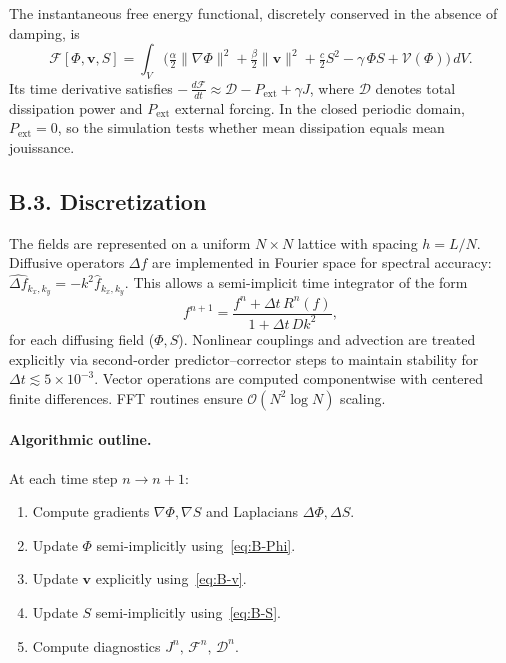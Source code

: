 \documentclass[12pt,a4paper]{article}
\begin{document}
The instantaneous free energy functional, discretely conserved in the absence of damping, is
\begin{equation}
\label{eq:B-F}
\mathcal{F}[\Phi,\mathbf{v},S]
 = \int_V
 \Big(
 \tfrac{\alpha}{2}\|\nabla\Phi\|^2
 + \tfrac{\beta}{2}\|\mathbf{v}\|^2
 + \tfrac{c}{2}S^2
 - \gamma\,\Phi S
 + \mathcal{V}(\Phi)
 \Big)\,dV.
\end{equation}
Its time derivative satisfies
\(-\,\tfrac{d\mathcal{F}}{dt}\!\approx\!\mathcal{D}-P_{\text{ext}}+\gamma J\),
where \(\mathcal{D}\) denotes total dissipation power and \(P_{\text{ext}}\) external forcing.
In the closed periodic domain, \(P_{\text{ext}}\!=\!0\), so the simulation tests whether mean dissipation equals mean jouissance.

\subsection*{B.3. Discretization}

The fields are represented on a uniform \(N\times N\) lattice with spacing \(h=L/N\).
Diffusive operators \(\Delta f\) are implemented in Fourier space for spectral accuracy:
\(\widehat{\Delta f}_{k_x,k_y} = -k^2 \hat{f}_{k_x,k_y}\).
This allows a semi-implicit time integrator of the form
\[
f^{n+1} = \frac{f^n + \Delta t\,R^n(f)}{1 + \Delta t\,D k^2},
\]
for each diffusing field (\(\Phi,S\)).
Nonlinear couplings and advection are treated explicitly via second-order predictor–corrector steps to maintain stability for \(\Delta t \lesssim 5\times10^{-3}\).
Vector operations are computed componentwise with centered finite differences.
FFT routines ensure \(\mathcal{O}(N^2\log N)\) scaling.

\paragraph{Algorithmic outline.}
At each time step \(n\to n+1\):

\begin{enumerate}[label=\arabic*., leftmargin=1.4em]
\item Compute gradients \(\nabla\Phi,\nabla S\) and Laplacians \(\Delta\Phi,\Delta S\).
\item Update \(\Phi\) semi-implicitly using~\eqref{eq:B-Phi}.
\item Update \(\mathbf{v}\) explicitly using~\eqref{eq:B-v}.
\item Update \(S\) semi-implicitly using~\eqref{eq:B-S}.
\item Compute diagnostics \(J^n,\,\mathcal{F}^n,\,\mathcal{D}^n\).
\end{enumerate}
\end{document}
